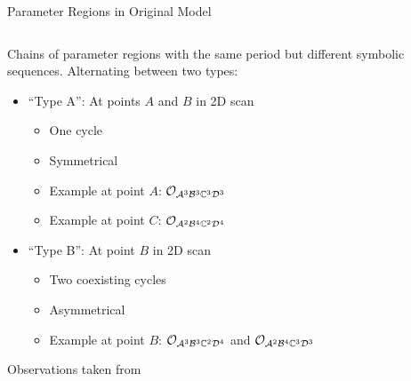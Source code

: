 \begin{frame}{Parameter Regions in Original Model}
    \vspace{-1em}
    \begin{columns}
        \begin{column}{0.7 \textwidth}
            Chains of parameter regions with the same period but different symbolic sequences.
            Alternating between two types:

            \begin{itemize}
                \item ``Type A'': At points $A$ and $B$ in 2D scan
                      \begin{itemize}
                          \item One cycle
                          \item Symmetrical
                          \item Example at point $A$: $\mathcal{O}_{\mathcal{A}^3\mathcal{B}^3\mathbb{C}^3\mathcal{D}^3}$
                          \item Example at point $C$: $\mathcal{O}_{\mathcal{A}^2\mathcal{B}^4\mathbb{C}^2\mathcal{D}^4}$ \vspace*{1em}
                      \end{itemize}
                \item ``Type B'': At point $B$ in 2D scan
                      \begin{itemize}
                          \item Two coexisting cycles
                          \item Asymmetrical
                          \item Example at point $B$: $\mathcal{O}_{\mathcal{A}^3\mathcal{B}^3\mathbb{C}^2\mathcal{D}^4}$ and $\mathcal{O}_{\mathcal{A}^2\mathcal{B}^4\mathbb{C}^3\mathcal{D}^3}$
                      \end{itemize}
            \end{itemize}

            \begin{flushright}
                Observations taken from \cite{akyuz2022}
            \end{flushright}
        \end{column}
        \begin{column}{0.3 \textwidth}
\end{column}
\end{columns}
\end{frame}
